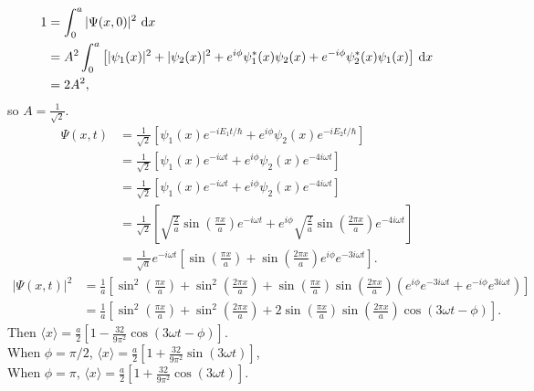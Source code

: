 \documentclass[en, oneside]{vivi}
\begin{document}
\begin{sol}
    \begin{align*}
        1 &= \int_{0}^{a}|\Psi(x, 0)|^2 \dif x\\
        &= A^2 \int_{0}^{a} \left[|\psi_1(x)|^2 + |\psi_2(x)|^2 + e^{i\phi}\psi_1^*(x)\psi_2(x) + e^{-i\phi}\psi_2^*(x)\psi_1(x) \right] \dif x\\
        &= 2 A^2,
    \end{align*}
    so $A = \frac{1}{\sqrt{2}}$.
    \begin{align*}
        \Psi(x, t) &= \frac{1}{\sqrt{2}} \left[\psi_1(x) e^{-iE_1t/\hbar} + e^{i\phi}\psi_2(x) e^{-iE_2t/\hbar}\right]\\
        &= \frac{1}{\sqrt{2}} \left[\psi_1(x) e^{-i \omega t} + e^{i\phi}\psi_2(x) e^{-4i \omega t}\right]\\
        &= \frac{1}{\sqrt{2}} \left[\psi_1(x) e^{-i \omega t} + e^{i\phi}\psi_2(x) e^{-4i \omega t}\right]\\
        &= \frac{1}{\sqrt{2}} \left[\sqrt{\frac{2}{a}} \sin\left(\frac{\pi x}{a}\right) e^{-i \omega t} + e^{i\phi}\sqrt{\frac{2}{a}} \sin\left(\frac{2\pi x}{a}\right) e^{-4i \omega t}\right]\\
        &= \frac{1}{\sqrt{a}} e^{-i \omega t} \left[\sin\left(\frac{\pi x}{a}\right) + \sin\left(\frac{2\pi x}{a}\right) e^{i\phi} e^{-3i \omega t}\right].
    \end{align*}
    \begin{align*}
        |\Psi(x, t)|^2 &= \frac{1}{a} \left[\sin^2\left(\frac{\pi x}{a}\right) + \sin^2\left(\frac{2\pi x}{a}\right) + \sin\left(\frac{\pi x}{a}\right)\sin\left(\frac{2\pi x}{a}\right) \left( e^{i\phi} e^{-3i \omega t} + e^{-i\phi} e^{3i \omega t} \right)\right]\\
        &= \frac{1}{a} \left[\sin^2\left(\frac{\pi x}{a}\right) + \sin^2\left(\frac{2\pi x}{a}\right) + 2 \sin\left(\frac{\pi x}{a}\right)\sin\left(\frac{2\pi x}{a}\right) \cos(3\omega t - \phi)\right].
    \end{align*}
    Then $\langle x \rangle = \frac{a}{2} \left[ 1 - \frac{32}{9\pi^2} \cos(3\omega t - \phi) \right]$.\\
    When $\phi = \pi/2$, $\langle x \rangle = \frac{a}{2} \left[ 1 + \frac{32}{9\pi^2} \sin(3\omega t) \right]$,\\
    When $\phi = \pi$, $\langle x \rangle = \frac{a}{2} \left[ 1 + \frac{32}{9\pi^2} \cos(3\omega t) \right]$.
\end{sol}
\end{document}
